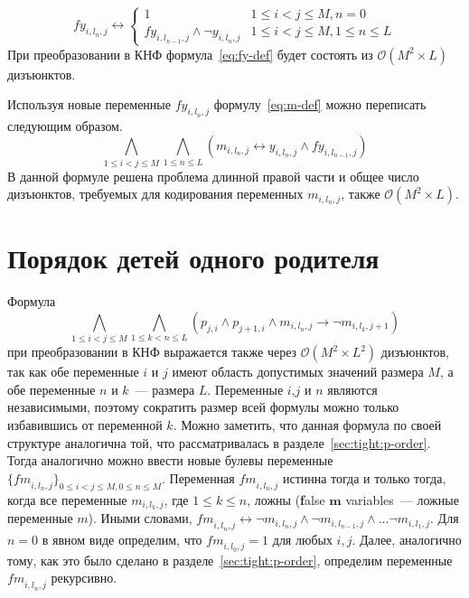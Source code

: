 \begin{equation}
\label{eq:fy-def}
  \mathit{fy}_{i,l_{n},j} \leftrightarrow 
    \begin{cases} 
      1                               & 1 \leq i < j \leq M, n = 0 \\
      \mathit{fy}_{i,l_{n - 1},j} \wedge \neg y_{i,l_{n},j}  & 1 \leq i < j \leq M, 1 \leq n \leq L
    \end{cases} 
\end{equation}
%
При преобразовании в КНФ формула~\eqref{eq:fy-def} будет состоять из $\mathcal{O}\left(M^{2} \times L\right)$ дизъюнктов.

Используя новые переменные $\mathit{fy}_{i,l_{n},j}$ формулу~\eqref{eq:m-def} можно переписать следующим образом.
%
\begin{equation}
\label{eq:m-def-tight}
  \bigwedge_{1 \leq i < j \leq M} \bigwedge_{1 \leq n \leq L} \left(m_{i,l_{n},j} \leftrightarrow y_{i,l_{n},j} \wedge \mathit{fy}_{i,l_{n - 1},j} \right)
\end{equation}
%
В данной формуле решена проблема длинной правой части и общее число дизъюнктов, требуемых для кодирования переменных $m_{i,l_{n},j}$, также $\mathcal{O}\left(M^{2} \times L\right)$. 


\section{Порядок детей одного родителя}
\label{sec:tight:m-order}

Формула $$\bigwedge_{1 \leq i < j \leq M} \bigwedge_{1 \leq k < n \leq L} \left(p_{j,i} \wedge p_{j + 1, i} \wedge m_{i,l_{n}, j} \rightarrow \neg m_{i, l_{k}, j + 1}\right)$$ при преобразовании в КНФ выражается также через $\mathcal{O}\left(M^{2} \times L^{2}\right)$ дизъюнктов, так как обе переменные $i$ и $j$ имеют область допустимых значений размера $M$, а обе переменные $n$ и $k$~{---} размера $L$.
Переменные $i$,$j$ и $n$ являются независимыми, поэтому сократить размер всей формулы можно только избавившись от переменной $k$.
Можно заметить, что данная формула по своей структуре аналогична той, что рассматривалась в разделе~\ref{sec:tight:p-order}.
Тогда аналогично можно ввести новые булевы переменные $\{\mathit{fm}_{i,l_{n},j}\}_{0 \leq i < j \leq M,0 \leq n \leq M}$.
Переменная $\mathit{fm}_{i,l_{n},j}$ истинна тогда и только тогда, когда все переменные $m_{i,l_{k},j}$, где $1 \leq k \leq n$, ложны (\textbf{f}alse $\boldsymbol{m}$ variables~{---} ложные переменные $m$).
Иными словами, $\mathit{fm}_{i,l_{n},j} \leftrightarrow \neg m_{i,l_{n},j} \wedge \neg m_{i, l_{n - 1}, j} \wedge \ldots \neg m_{i,l_{1},j}$. 
Для $n = 0$ в явном виде определим, что $\mathit{fm}_{i,l_{0},j} = 1$ для любых $i,j$.
Далее, аналогично тому, как это было сделано в разделе~\ref{sec:tight:p-order}, определим переменные $\mathit{fm}_{i,l_{n},j}$ рекурсивно.

